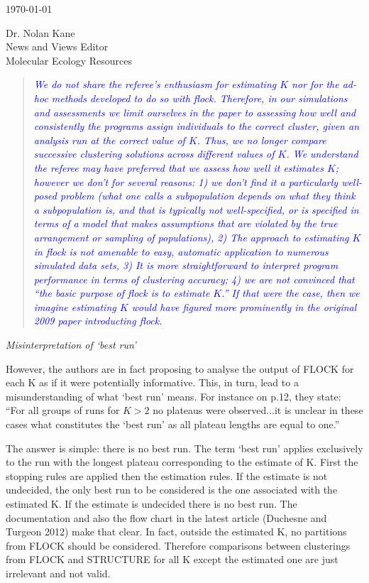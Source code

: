 \documentclass[11pt]{letter}
\newcommand{\reply}[1]{\begin{quotation}\small\sl\textcolor{blue}{#1}\end{quotation}}
\begin{document}
\begin{letter}{ \today 

Dr. Nolan Kane\\
News and Views Editor\\
Molecular Ecology Resources \\
}
\reply{We do not share the referee's enthusiasm for estimating $K$ nor for the {\em ad-hoc}
methods developed to do so with {\sc flock}.  Therefore, in our simulations and assessments
we limit ourselves in the paper to assessing how well and consistently the programs assign
individuals to the correct cluster, {\em given an analysis run at the correct value of $K$}.
Thus, we no longer compare successive clustering solutions across different values of $K$. We 
understand the referee may have preferred that we assess how well it estimates $K$; however we don't
for several reasons: 1) we don't find it a particularly well-posed problem (what one calls a
subpopulation depends on what they think a subpopulation is, and that is typically not well-specified,
or is specified in terms of a model that makes assumptions that are violated by
the true arrangement or sampling of populations),
2) The approach to estimating $K$ in {\sc flock} is not amenable to easy, automatic application to
numerous simulated data sets, 3) It is more straightforward to interpret program performance in terms
of clustering accuracy; 4) we are not convinced that ``the basic purpose of {\sc flock} is to
estimate $K$.''  If that were the case, then we imagine estimating $K$ would have figured
more prominently in the original 2009 paper introducting {\sc flock}.
}

{\em Misinterpretation of `best run'}

However, the authors are in fact proposing to analyse the output of FLOCK for each K as if it were potentially informative. This, in turn, lead to a misunderstanding of what `best run' means. For instance on p.12, they state:
``For all groups of runs for $K> 2$ no plateaus were observed...it is unclear in these cases what constitutes the `best run' as all plateau lengths are equal to one.''

The answer is simple: there is no best run. The term `best run' applies exclusively to the run with the longest plateau corresponding to the estimate of K. First the stopping rules are applied then the estimation rules. If the estimate is not undecided, the only best run to be considered is the one associated with the estimated K. If the estimate is undecided there is no best run. The documentation and also the flow chart in the latest article (Duchesne and Turgeon 2012) make that clear. In fact, outside the estimated K, no partitions from FLOCK should be considered. Therefore comparisons between clusterings from FLOCK and STRUCTURE for all K except the estimated one are just irrelevant and not valid.


\end{letter}
\end{document}
